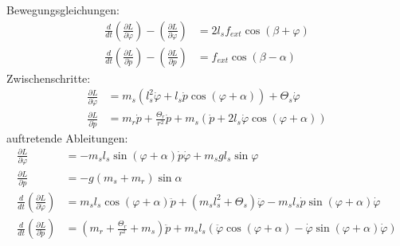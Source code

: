 	Bewegungsgleichungen:
	\begin{align*}
		\frac{d}{dt}\left(\frac{\partial L}{\partial \dot{\varphi}}\right) - \left(\frac{\partial L}{\partial \varphi}\right) &= 2l_sf_{ext}\cos\left(\beta + \varphi\right) \\
		\frac{d}{dt}\left(\frac{\partial L}{\partial \dot{p}}\right) - \left(\frac{\partial L}{\partial p}\right) &= f_{ext}\cos\left(\beta - \alpha\right)
	\end{align*}
	Zwischenschritte:
	\begin{align*}
		\frac{\partial L}{\partial \dot{\varphi}} &= m_s\left(l_s^2\dot{\varphi} + l_s\dot{p}\cos\left(\varphi + \alpha\right)\right) + \Theta_s \dot{\varphi} \\
		\frac{\partial L}{\partial \dot{p}} &= m_r\dot{p} + \frac{\Theta_r}{r^2}\dot{p} + m_s\left(\dot{p} + 2l_s\dot{\varphi}\cos\left(\varphi + \alpha\right)\right)
	\end{align*}
	auftretende Ableitungen:
	\begin{align*}
		\frac{\partial L}{\partial \varphi} &= -m_sl_s\sin\left(\varphi + \alpha\right)\dot{p}\dot{\varphi} + m_sgl_s\sin\varphi \\
		\frac{\partial L}{\partial p} &= -g\left(m_s + m_r\right)\sin\alpha \\
		\frac{d}{dt}\left(\frac{\partial L}{\partial \dot{\varphi}}\right) &= m_sl_s\cos\left(\varphi + \alpha\right)\ddot{p} + \left(m_sl_s^2 + \Theta_s\right)\ddot{\varphi} - m_sl_s\dot{p}\sin\left(\varphi + \alpha\right)\dot{\varphi} \\
		\frac{d}{dt}\left(\frac{\partial L}{\partial \dot{p}}\right) &= \left(m_r + \frac{\Theta_r}{r^2} + m_s\right)\ddot{p} + m_sl_s\left(\ddot{\varphi}\cos\left(\varphi + \alpha\right) - \dot{\varphi}\sin\left(\varphi + \alpha\right)\dot{\varphi} \right)
	\end{align*}